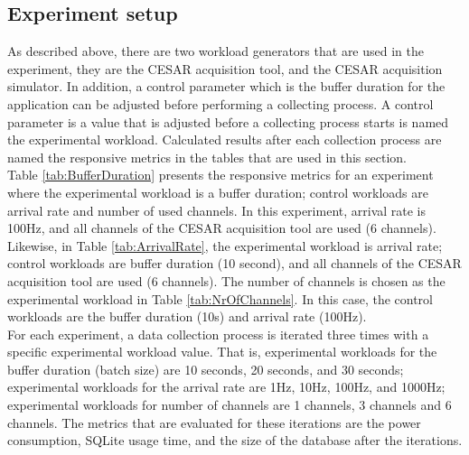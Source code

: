 \subsection{Experiment setup}
As described above, there are two workload generators that are used in the experiment, they are the CESAR acquisition tool, and the CESAR acquisition simulator. In addition, a control parameter which is the buffer duration for the application can be adjusted before performing a collecting process. A control parameter is a value that is adjusted before a collecting process starts is named the experimental workload. Calculated results after each collection process are named the responsive metrics in the tables that are used in this section.\\
Table \ref{tab:BufferDuration} presents the responsive metrics for an experiment where the experimental workload is a buffer duration; control workloads are arrival rate and number of used channels. In this experiment, arrival rate is 100Hz, and all channels of the CESAR acquisition tool are used (6 channels). Likewise, in Table \ref{tab:ArrivalRate}, the experimental workload is arrival rate; control workloads are buffer duration (10 second), and all channels of the CESAR acquisition tool are used (6 channels). The number of channels is chosen as the experimental workload in Table \ref{tab:NrOfChannels}. In this case, the control workloads are the buffer duration (10s) and arrival rate (100Hz).\\
For each experiment, a data collection process is iterated three times with a specific experimental workload value. That is, experimental workloads for the buffer duration (batch size) are 10 seconds, 20 seconds, and 30 seconds; experimental workloads for the arrival rate are 1Hz, 10Hz, 100Hz, and 1000Hz; experimental workloads for number of channels are 1 channels, 3 channels and 6 channels. The metrics that are evaluated for these iterations are the power consumption, SQLite usage time, and the size of the database after the iterations.\\
